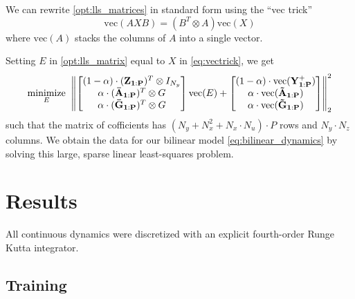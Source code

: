 \documentclass{article}
\begin{document}
  We can rewrite \eqref{opt:lls_matrices} in standard form using the ``vec trick''
  \begin{equation} \label{eq:vectrick}
      \text{vec}(A X B) = (B^T \otimes A) \text{vec}(X)
  \end{equation}
  where $\text{vec}(A)$ stacks the columns of $A$ into a single vector.

  Setting $E$ in \eqref{opt:lls_matrix} equal to $X$ in \eqref{eq:vectrick}, we get
  \begin{align} \label{opt:lls_matrix}
      \underset{E}{\text{minimize}} \;\;  
      \norm{
          \begin{bmatrix}
              (1-\alpha)\cdot(\mathbf{Z_{1:P}})^T \otimes I_{N_y} \\
              \alpha\cdot(\mathbf{\bar{A}_{1:P}})^T \otimes G \\
              \alpha\cdot(\mathbf{\bar{G}_{1:P}})^T \otimes G \\
          \end{bmatrix}
          \text{vec}(E)
          +
          \begin{bmatrix}
              (1-\alpha)\cdot\text{vec}(\mathbf{Y^+_{1:P}}) \\
              \alpha\cdot\text{vec}(\mathbf{\tilde{A}_{1:P}}) \\
              \alpha\cdot\text{vec}(\mathbf{\tilde{G}_{1:P}})
          \end{bmatrix}
      }_2^2
  \end{align}
  such that the matrix of cofficients has $(N_y + N_x^2 + N_x \cdot N_u) \cdot P$ rows and 
  $N_y \cdot N_z$ columns. We obtain the data for our bilinear model 
  \eqref{eq:bilinear_dynamics} by solving this large, sparse linear least-squares 
  problem.

\section{Results} \label{sec:results}
All continuous dynamics were discretized with an explicit fourth-order Runge Kutta 
integrator.

\subsection{Training}
\end{document}

